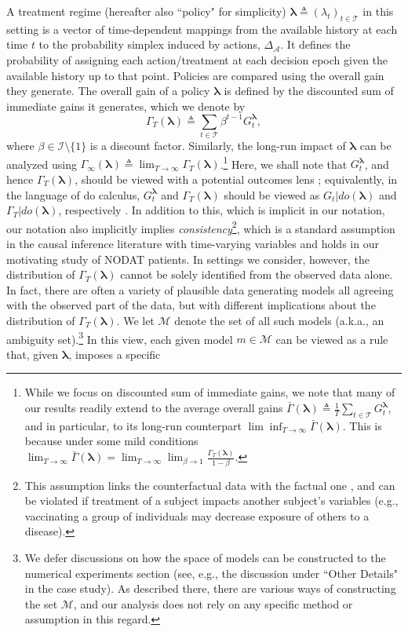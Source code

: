 \documentclass[opre,nonblindrev]{informs2}%
\newcommand{\teq}{\triangleq}
\newcommand{\1}{\hbox{\rm 1\kern-.35em 1}}
\newcommand{\MA}{\mathscr A}
\newcommand{\MT}{\mathscr T}
\newcommand{\MI}{\mathscr I}
\newcommand{\MM}{\mathscr M}
\newcommand{\blambda}{\boldsymbol{\lambda}}
\begin{document}
A treatment regime (hereafter also ``policy" for simplicity) $\blambda\teq(\lambda_t)_{t\in\MT}$ in this setting is a vector of time-dependent mappings from the available history at each time $t$ to the probability simplex induced by actions, $\Delta_\MA$. It defines the probability of assigning each action/treatment at each decision epoch given the available history up to that point. Policies are compared using the overall gain they generate. The overall gain of a policy  $\blambda$  is defined by the discounted sum of immediate gains it generates, which we denote by
\begin{equation}\label{disgain}
\Gamma_T(\blambda)\teq\sum_{t\in\MT} \beta^{t-1} G_t^{\blambda},
\end{equation}
where $\beta\in\MI\setminus\{1\}$ is a discount factor. Similarly, the long-run impact of   $\blambda$ can be analyzed using $\Gamma_\infty(\blambda)\teq\lim_{T\to\infty} \Gamma_T(\blambda)$.\footnote{While we focus on discounted sum of immediate gains, we note that many of our results readily extend to the average overall gains $\bar\Gamma(\blambda)\teq\frac{1}{T}\sum_{t\in\MT} G_t^{\blambda}$, and in particular, to its long-run counterpart $\lim\inf_{T\to\infty} \bar\Gamma(\blambda)$. This is because under some mild conditions $\lim_{T\to\infty} \bar\Gamma(\blambda)= \lim_{T\to\infty} \lim_{\beta\to1} \frac{\Gamma_T(\blambda)}{1-\beta}$.} Here, we shall note that $G_t^{\blambda}$, and hence $\Gamma_T(\blambda)$, should be viewed with a {potential outcomes} lens \citep[for more discussions, see, e.g.,][]{Robins1986, Rubin1986, Angrist1996, Robins1997,Murphy2001}; equivalently, in the language of {do calculus}, $G_t^{\blambda}$ and $\Gamma_T(\blambda)$ should be viewed as $G_t| do(\blambda)$ and $\Gamma_T| do(\blambda)$, respectively \citep[see, e.g.,][]{Pearl2009}. In addition to this, which is implicit in our notation, our notation also implicitly implies {\em consistency}\footnote{This assumption links the counterfactual data with the factual one \citep{Robins1997}, and can be violated if treatment of a subject impacts another subject's variables (e.g., vaccinating a group of individuals may decrease exposure of others to a disease).}, which is a standard assumption in the causal inference literature with  time-varying variables \citep[see, e.g.,][]{Robins1997,Murphy2001} and holds in our motivating study of NODAT patients.  In settings we consider, however, the distribution of $\Gamma_T(\blambda)$ cannot be solely identified from the observed data alone. In fact, there are often a variety of plausible data generating models all agreeing with the observed part of the data, but with different implications about the distribution of $\Gamma_T(\blambda)$.  We let $\MM$ denote the set of all such models (a.k.a., an ambiguity set).\footnote{We defer discussions on how the space of models can be constructed to the numerical experiments section (see, e.g., the discussion under ``Other Details" in the case study). As described there, there are various ways of constructing the set $\MM$, and our analysis does not rely on any specific method or assumption in this regard.} In this view, each given model $m\in\MM$ can be viewed as a rule that, given $\blambda$, imposes a specific 
\end{document}
